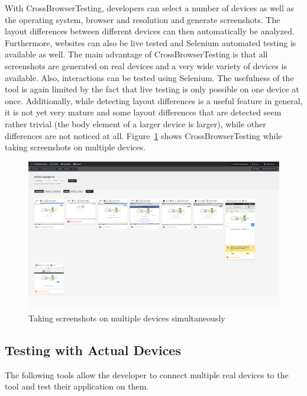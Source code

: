 With CrossBrowserTesting, developers can select a number of devices as well as the operating system, browser and resolution and generate screenshots. The layout differences between different devices can then automatically be analyzed. Furthermore, websites can also be live tested and Selenium automated testing is available as well. The main advantage of CrossBrowserTesting is that all screenshots are generated on real devices and a very wide variety of devices is available. Also, interactions can be tested using Selenium. The usefulness of the tool is again limited by the fact that live testing is only possible on one device at once. Additionally, while detecting layout differences is a useful feature in general, it is not yet very mature and some layout differences that are detected seem rather trivial (the body element of a larger device is larger), while other differences are not noticed at all. Figure~\ref{fig:crossbrowsertesting} shows CrossBrowserTesting while taking screenshots on multiple devices.

\begin{figure}[H]
  \centering
    \includegraphics[width=1.0\textwidth]{images/relatedwork/cross_browser_testing.png}
	\caption[Screenshot: CrossBrowserTesting]{Taking screenshots on multiple devices simultaneously}
	\label{fig:crossbrowsertesting}
\end{figure}

\subsection{Testing with Actual Devices}

The following tools allow the developer to connect multiple real devices to the tool and test their application on them.

